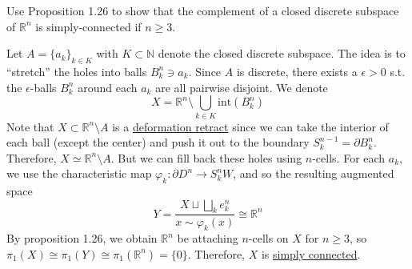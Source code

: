 	\begin{exercise}[Hatcher 1.2.6]
		Use Proposition 1.26 to show that the complement of a closed discrete subspace of $\mathbb{R}^n$ is simply-connected if $n \geq 3$.
	\end{exercise}
	\begin{solution}
		Let $A = \{a_k\}_{k \in K}$ with $K \subset \mathbb{N}$ denote the closed discrete subspace. The idea is to ``stretch'' the holes into balls $B_k^n \ni a_k$. Since $A$ is discrete, there exists a $\epsilon > 0$ s.t. the $\epsilon$-balls $B_k^n$ around each $a_k$ are all pairwise disjoint. We denote 
		\begin{equation}
			X = \mathbb{R}^n \setminus \bigcup_{k \in K} \mathrm{int}(B_k^n)
		\end{equation}
		Note that $X \subset \mathbb{R}^n \setminus A$ is a \hyperref[def:deformation-retract]{deformation retract} since we can take the interior of each ball (except the center) and push it out to the boundary $S_k^{n-1} = \partial B_k^n$. Therefore, $X \simeq \mathbb{R}^n \setminus A$. But we can fill back these holes using $n$-cells. For each $a_k$, we use the characteristic map $\varphi_k : \partial D^n \to S_k^nW$, and so the resulting augmented space 
		\begin{equation}
			Y = \frac{X \sqcup \bigsqcup_k e_k^n}{x \sim \varphi_k (x)} \cong \mathbb{R}^n
		\end{equation}
		By proposition 1.26, we obtain $\mathbb{R}^n$ be attaching $n$-cells on $X$ for $n \geq 3$, so $\pi_1 (X) \cong \pi_1 (Y) \cong \pi_1 (\mathbb{R}^n) = \{0\}$. Therefore, $X$ is \hyperref[def:simply-connected]{simply connected}. 
	\end{solution}

